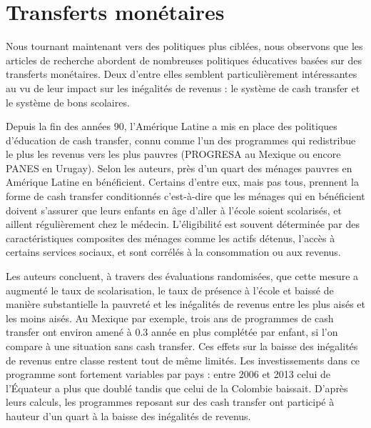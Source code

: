\documentclass[pagesize, twoside=off, bibliography=totoc, DIV=calc, fontsize=12pt, a4paper, french]{scrartcl}
\begin{document}
\section{Transferts monétaires}

\label{sec_transferts}

Nous tournant maintenant vers des politiques plus ciblées, nous observons que les articles de recherche abordent de nombreuses politiques éducatives basées sur des transferts monétaires.
Deux d’entre elles semblent particulièrement intéressantes au vu de leur impact sur les inégalités de revenus : le système de cash transfer et le système de bons scolaires.

Depuis la fin des années 90, l’Amérique Latine a mis en place des politiques d’éducation de cash transfer, connu comme l’un des programmes qui redistribue le plus les revenus vers les plus pauvres (PROGRESA au Mexique ou encore PANES en Urugay).
Selon les auteurs, près d’un quart des ménages pauvres en Amérique Latine en bénéficient.
Certains d’entre eux, mais pas tous, prennent la forme de cash transfer conditionnés c’est-à-dire que les ménages qui en bénéficient doivent s’assurer que leurs enfants en âge d’aller à l’école soient scolarisés, et aillent régulièrement chez le médecin.
L’éligibilité est souvent déterminée par des caractéristiques composites des ménages comme les actifs détenus, l’accès à certains services sociaux, et sont corrélés à la consommation ou aux revenus.


Les auteurs concluent, à travers des évaluations randomisées, que cette mesure a augmenté le taux de scolarisation, le taux de présence à l’école et baissé de manière substantielle la pauvreté et les inégalités de revenus entre les plus aisés et les moins aisés.
Au Mexique par exemple, trois ans de programmes de cash transfer ont environ amené à 0.3 année en plus complétée par enfant, si l’on compare à une situation sans cash transfer.
Ces effets sur la baisse des inégalités de revenus entre classe restent tout de même limités.
Les investissements dans ce programme sont fortement variables par pays : entre 2006 et 2013 celui de l’Équateur a plus que doublé tandis que celui de la Colombie baissait.
D’après leurs calculs, les programmes reposant sur des cash transfer ont participé à hauteur d’un quart à la baisse des inégalités de revenus.
\end{document}
